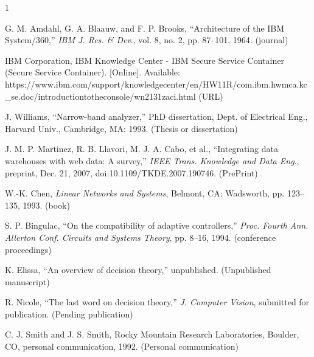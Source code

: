 \documentclass{IEEEcsmag}
\begin{document}
\begin{thebibliography}{1}

G. M. Amdahl, G. A. Blaauw, and F. P. Brooks, ``Architecture of the IBM System/360,'' {\it IBM J. Res. \& Dev}., vol. 8, no. 2, pp. 87--101, 1964. (journal)

IBM Corporation, IBM Knowledge Center - IBM Secure Service Container (Secure Service Container). [Online]. Available: {https://www.ibm.com/support/\break knowledgecenter/en/HW11R/com.ibm.hwmca.kc\_se.doc/\break introductiontotheconsole/wn2131zaci.html} (URL)

J. Williams, ``Narrow-band analyzer,'' PhD dissertation, Dept. of Electrical Eng., Harvard Univ., Cambridge, MA: 1993. (Thesis or dissertation)

J. M. P. Martinez, R. B. Llavori, M. J. A. Cabo, et al., ``Integrating data warehouses with web data: A survey,'' {\it IEEE Trans. Knowledge and Data Eng}., preprint, Dec. 21, 2007, doi:10.1109/TKDE.2007.190746. (PrePrint)

W.-K. Chen, {\it Linear Networks and Systems}, Belmont, CA: Wadsworth, pp. 123--135, 1993. (book)

S. P. Bingulac, ``On the compatibility of adaptive controllers,'' {\it Proc. Fourth Ann. Allerton Conf. Circuits and Systems Theory}, pp. 8--16, 1994. (conference proceedings)

K. Elissa, ``An overview of decision theory,'' unpublished. (Unpublished manuscript)

R. Nicole, ``The last word on decision theory,'' {\it J. Computer Vision}, submitted for publication. (Pending publication)

C. J. Smith and J. S. Smith, Rocky Mountain Research Laboratories, Boulder, CO, personal communication, 1992. (Personal communication)
\end{thebibliography}
\end{document}

